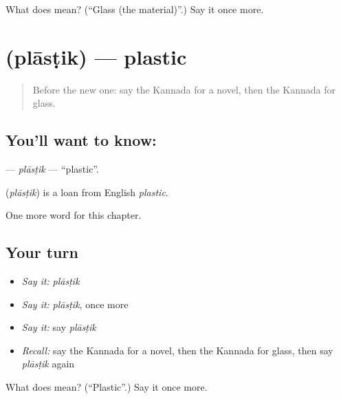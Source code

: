 \begin{tcolorbox}[breakable,colback=teal!4,colframe=teal!35!black,title={Before you move on}]
What does  mean? (\textquotedblleft{}Glass (the material)\textquotedblright{}.) Say it once more.
\end{tcolorbox}
\section[\texorpdfstring{\kn{ಪ್ಲಾಸ್ಟಿಕ್} (plāsṭik)}{ಪ್ಲಾಸ್ಟಿಕ್ (plāsṭik)}]{ (plāsṭik) — plastic}

\label{lesson:KA-C301-plastik}



\begin{quote}
Before the new one: say the Kannada for a novel, then the Kannada for glass.
\end{quote}

\subsection*{You'll want to know: }
\textbf{} — \emph{plāsṭik} — \textquotedblleft{}plastic\textquotedblright{}.

\begin{cousinweb}
\textbf{} (\emph{plāsṭik}) is a loan from English \emph{plastic}.
\end{cousinweb}

\begin{grammarlens}[title={What you've built}]
One more word for this chapter.
\end{grammarlens}

\subsection*{Your turn}
\begin{itemize}
\raggedright
  \item \emph{Say it:} \emph{plāsṭik}
  \item \emph{Say it:} \emph{plāsṭik}, once more
  \item \emph{Say it:} say \emph{plāsṭik}
  \item \emph{Recall:} say the Kannada for a novel, then the Kannada for glass, then say \emph{plāsṭik} again
\end{itemize}

\begin{tcolorbox}[breakable,colback=teal!4,colframe=teal!35!black,title={Before you move on}]
What does  mean? (\textquotedblleft{}Plastic\textquotedblright{}.) Say it once more.
\end{tcolorbox}
